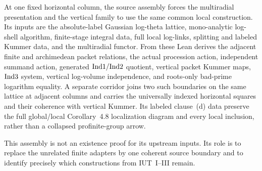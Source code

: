 \begin{definition}
  \label{def:source-theorem-311-column-boundary}
  \leanok
  At one fixed horizontal column, the source assembly forces the
  multiradial presentation and the vertical family to use the same common
  local construction.  Its inputs are the absolute-label Gaussian
  log-theta lattice, mono-analytic log-shell algorithm, finite-stage integral
  data, full local log-links, splitting and labeled Kummer data, and the
  multiradial functor.  From these Lean derives
  the adjacent finite and archimedean packet relations,
  the actual procession action, independent summand action, generated
  \(\mathrm{Ind1}/\mathrm{Ind2}\) quotient, vertical packet Kummer maps, \(\mathrm{Ind3}\)
  system, vertical log-volume independence, and roots-only bad-prime logarithm
  equality.  A separate corridor joins two such boundaries on the same
  lattice at adjacent columns and carries the universally indexed horizontal
  squares and their coherence with vertical Kummer.  Its labeled clause~(d)
  data preserve the full global/local Corollary~4.8 localization diagram and
  every local inclusion, rather than a collapsed profinite-group arrow.

  This assembly is not an existence proof for its upstream inputs.  Its role
  is to replace the unrelated finite adapters by one coherent source boundary
  and to identify precisely which constructions from IUT~I--III remain.
\end{definition}

